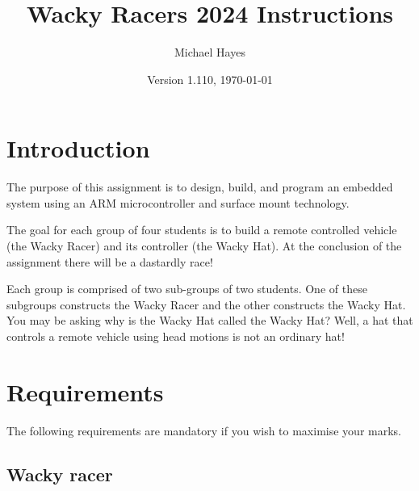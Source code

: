 \documentclass[11pt, a4paper]{article}
\title{Wacky Racers 2024 Instructions}
\author{Michael Hayes}
\date{Version 1.110, \today}
\begin{document}
\maketitle

\section{Introduction}

The purpose of this assignment is to design, build, and program an
embedded system using an ARM microcontroller and surface mount
technology.

The goal for each group of four students is to build a remote
controlled vehicle (the Wacky Racer) and its controller (the Wacky
Hat).  At the conclusion of the assignment there will be a dastardly race!

Each group is comprised of two sub-groups of two students.  One of
these subgroups constructs the Wacky Racer and the other constructs
the Wacky Hat.  You may be asking why is the Wacky Hat called the
Wacky Hat?  Well, a hat that controls a remote vehicle using head
motions is not an ordinary hat!


\section{Requirements}

The following requirements are mandatory if you wish to maximise your
marks.


\subsection{Wacky racer}
\end{document}
